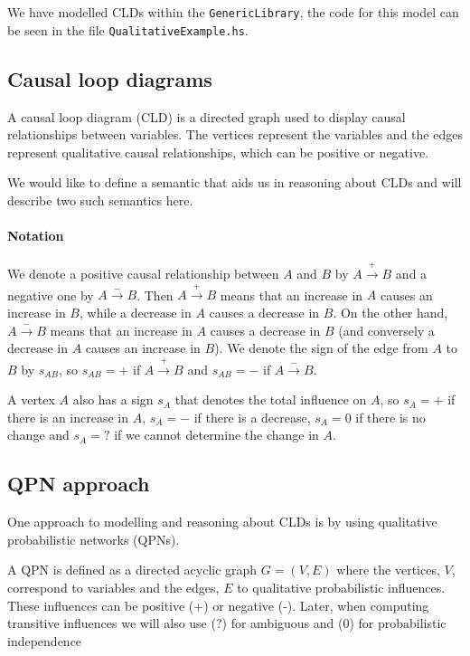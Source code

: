 \documentclass[]{article}
\begin{document}
We have modelled CLDs within the \verb|GenericLibrary|, the code for this model
can be seen in the file \verb|QualitativeExample.hs|. \\

\subsection{Causal loop diagrams}

A causal loop diagram (CLD) is a directed graph used to display causal
relationships between variables.
%
The vertices represent the variables and the edges represent qualitative
causal relationships, which can be positive or negative.

We would like to define a semantic that aids us in reasoning about CLDs and will
describe two such semantics here.

\paragraph{Notation}
We denote a positive causal relationship between $A$ and $B$ by
$A\xrightarrow{+} B$ and a negative one by $A \xrightarrow{-} B$.
%
Then $A \xrightarrow{+} B$ means that an increase in $A$ causes an
increase in $B$, while a decrease in $A$ causes a decrease in $B$.
%
On the other hand, $A\xrightarrow{-} B$ means that an increase in $A$
causes a decrease in $B$ (and conversely a decrease in $A$ causes an
increase in $B$).
%
We denote the sign of the edge from $A$ to $B$ by $s_{AB}$, so
$s_{AB}= +$ if $A\xrightarrow{+} B$ and $s_{AB}=-$ if
$A\xrightarrow{-} B$.

A vertex $A$ also has a sign $s_A$ that denotes the total influence on $A$, so
$s_A=+$ if there is an increase in $A$, $s_A=-$ if there is a decrease, $s_A=0$
if there is no change and $s_A=?$ if we cannot determine the change in $A$.

\subsection{QPN approach}

One approach to modelling and reasoning about CLDs is by using qualitative
probabilistic networks (QPNs).

A QPN is defined as a directed
acyclic graph $G=(V,E)$ where the vertices, $V$, correspond to
variables and the edges, $E$ to qualitative probabilistic influences.
%
These influences can be positive (+) or negative (-).
%
Later, when computing transitive influences we will also use (?) for
ambiguous and (0) for probabilistic independence
\end{document}
